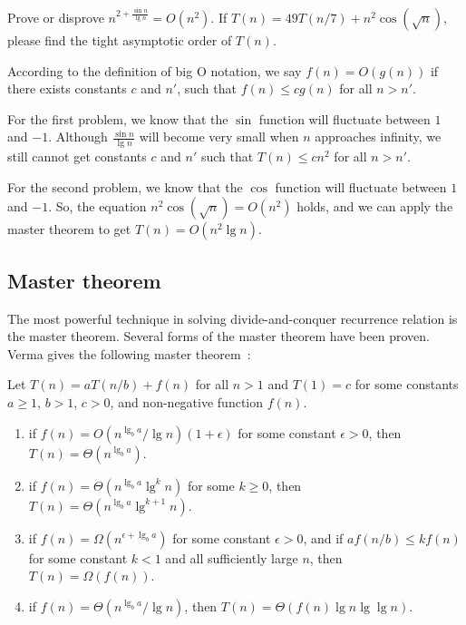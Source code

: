 \begin{Exercise}[origin={YZU CSIE 90}]
\Question Prove or disprove $n^{2 + \frac{\sin n}{\lg n}} = O(n^2)$.
\Question If $T(n) = 49T(n/7) + n^2 \cos (\sqrt{n})$, please find the tight asymptotic order of $T(n)$.
\end{Exercise}
\begin{Answer}
According to the definition of big O notation, we say $f(n) = O(g(n))$ if there exists constants $c$ and $n'$, such that $f(n) \leq cg(n)$ for all $n > n'$.

For the first problem, we know that the $\sin$ function will fluctuate between $1$ and $-1$. Although $\frac{\sin n}{\lg n}$ will become very small when $n$ approaches infinity, we still cannot get constants $c$ and $n'$ such that $T(n) \leq cn^2$ for all $n > n'$.

For the second problem, we know that the $\cos$ function will fluctuate between $1$ and $-1$. So, the equation $n^2 \cos (\sqrt{n}) = O(n^2)$ holds, and we can apply the master theorem to get $T(n) = O(n^2 \lg n)$.
\end{Answer}

\subsection{Master theorem}
The most powerful technique in solving divide-and-conquer recurrence relation is the master theorem.
Several forms of the master theorem have been proven. Verma gives the following master theorem~\cite{Verma1994}:
\begin{theorem}
Let $T(n) = aT(n / b) + f(n)$ for all $n > 1$ and $T(1) = c$ for some constants $a \geq 1$, $b > 1$, $c > 0$, and non-negative function $f(n)$.
\begin{enumerate}
\item if $f(n) = O(n^{\lg_b a} / \lg n)(1 + \epsilon)$ for some constant $\epsilon > 0$, then $T(n) = \Theta(n^{\lg_b a})$.
\item if $f(n) = \Theta(n^{\lg_b a} \lg^k n)$ for some $k \geq 0$, then $T(n) = \Theta(n^{\lg_b a} \lg^{k+1} n)$.
\item if $f(n) = \Omega(n^{\epsilon + \lg_b a})$ for some constant $\epsilon > 0$, and if $af(n/b) \leq kf(n)$ for some constant $k < 1$ and all sufficiently large $n$, then $T(n) = \Omega(f(n))$.
\item if $f(n) = \Theta(n^{\lg_b a} / \lg n)$, then $T(n) = \Theta(f(n) \lg n \lg \lg n)$.
\end{enumerate}
\end{theorem}

